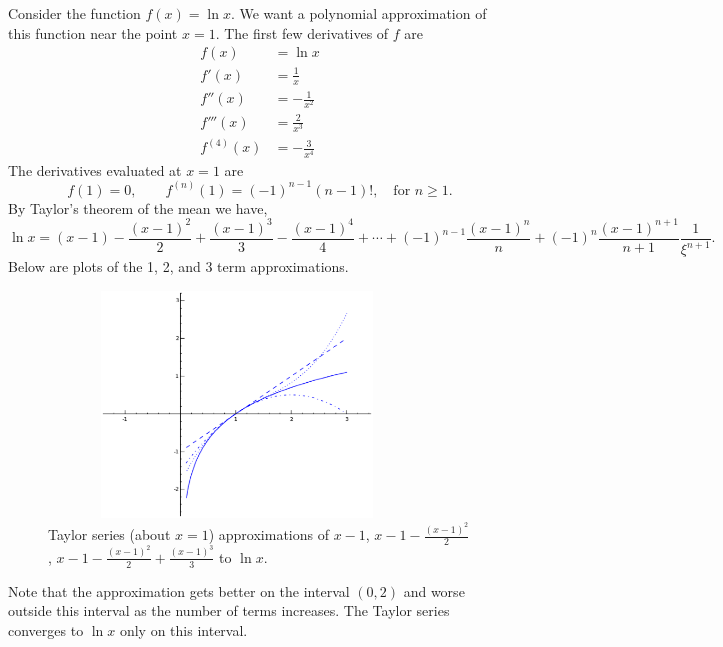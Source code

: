 \begin{example}
{\rm
  Consider the function $f(x) = \ln x$.  We want a polynomial approximation of
  this function near the point $x = 1$. The first few derivatives of $f$ are
  \begin{align*}
    f(x) &= \ln x \\
    f'(x) &= \frac{1}{x} \\
    f''(x) &= - \frac{1}{x^2} \\
    f'''(x) &= \frac{2}{x^3} \\
    f^{(4)}(x) &= - \frac{3}{x^4}
  \end{align*}
  The derivatives evaluated at $x = 1$ are
  \[
  f(1) = 0, \qquad f^{(n)}(1) = (-1)^{n-1} (n-1)!,\ \ \ \text{ for } n \geq 1.
  \]
  By Taylor's theorem of the mean we have,
  \[
  \ln x = (x-1) - \frac{(x-1)^2}{2} + \frac{(x-1)^3}{3} - \frac{(x-1)^4}{4}
  + \cdots + (-1)^{n-1} \frac{(x-1)^n}{n} 
  + (-1)^n \frac{(x-1)^{n+1}}{n+1} \frac{1}{\xi^{n+1}}.
  \]
  Below are plots of the 1, 2, and 3 term approximations.  

\begin{figure}[h!]
\begin{minipage}{\textwidth}
\begin{center}
\includegraphics[height=6cm,width=10cm]{taylnt3.eps}
\end{center}
\end{minipage}
\caption{Taylor series (about $x=1$) approximations of $x-1$, $x-1-\frac{(x-1)^2}{2}$,
$x-1-\frac{(x-1)^2}{2}+\frac{(x-1)^3}{3}$ to $\ln x$.}
\label{fig:taylnt4}
\label{taylnt4}
\end{figure}


  Note that the 
  approximation gets better on the interval $(0,2)$ and worse outside this
  interval as the number of terms increases.  The Taylor series converges to
  $\ln x$ only on this interval.
}
\end{example}





